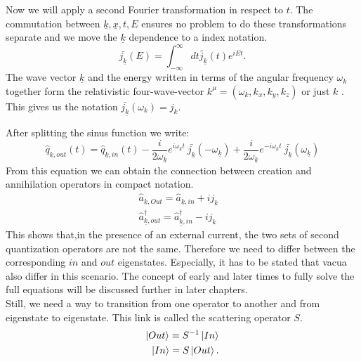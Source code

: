 \documentclass[12pt, titlepage]{article}
\begin{document}
Now we will apply a second Fourier transformation in respect to $ t $. The commutation between $ \underline{k},\underline{x},t,E $ ensures no problem to do these transformations separate and we move the $ \underline{k} $ dependence to a index notation.
\begin{equation}
\bar{j_{\underline{k}}}(E)= \int^{\infty}_{-\infty}dt \tilde{j_{\underline{k}}}(t) e^{iEt}.
\end{equation}
The wave vector $ \underline{k} $ and the energy written in terms of the angular frequency $ \omega_{k} $ together form the relativistic  four-wave-vector $ k^{\mu}=(\omega_k,k_x,k_y,k_z) $ or just $ k $ . This gives us the notation $ \bar{j_{\underline{k}}}(\omega_k)=j_k $.

After splitting the sinus function we write:
\begin{equation}
\hat{q}_{\underline{k},out}(t) 
  =
  \hat{q}_{\underline{k},in}(t) 
  -
  	\dfrac{i}{2\omega_{\underline{k}}}e^{i\omega_{\underline{k}}t}\
  	\bar{j_{\underline{k}}}(-\omega_{\underline{k}})
  +
  	\dfrac{i}{2\omega_{\underline{k}}}e^{-i\omega_{\underline{k}}t}\
  	\bar{j_{\underline{k}}}(\omega_{\underline{k}})
\end{equation}
From this equation we can obtain the connection between creation and annihilation operators in compact notation.
\begin{subequations}
\begin{align}
\hat{a}_{\underline{k},Out}=  \hat{a}_{\underline{k},in}+i
j_k
&\\
\hat{a}^{\dagger}_{\underline{k},out} = \hat{a}^{\dagger}_{\underline{k},in}
-i
j_k
\end{align}
\end{subequations}
This shows that,in the presence of an external current, the two sets of second quantization operators are not the same. Therefore we need to differ between the corresponding $ in $ and $ out $ eigenstates. Especially, it has to be stated that vacua also differ in this scenario. The concept of early and later times to fully solve the full equations will be discussed further in later chapters.
\\
Still, we need a way to transition from one operator to another and from eigenstate to eigenstate. This link is called the scattering operator $ S $.
\begin{subequations}
\begin{align}
\ket{Out}=S^{-1}\ket{In}
&\\
\ket{In}=S\ket{Out}.
\end{align}
\end{subequations}
\end{document}
